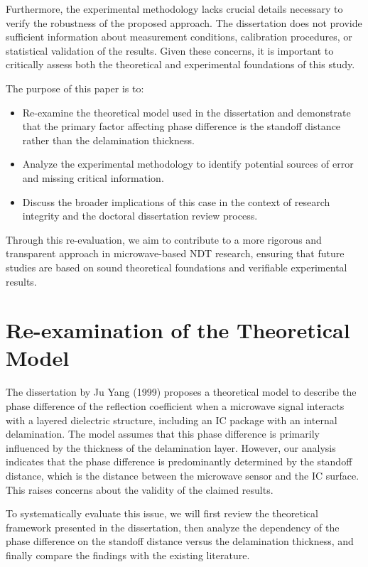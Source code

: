 \documentclass[10pt,twocolumn]{article}
\begin{document}
Furthermore, the experimental methodology lacks crucial details necessary to verify the robustness of the proposed approach. The dissertation does not provide sufficient information about measurement conditions, calibration procedures, or statistical validation of the results. Given these concerns, it is important to critically assess both the theoretical and experimental foundations of this study.

The purpose of this paper is to:
\begin{itemize}
    \item Re-examine the theoretical model used in the dissertation and demonstrate that the primary factor affecting phase difference is the standoff distance rather than the delamination thickness.
    \item Analyze the experimental methodology to identify potential sources of error and missing critical information.
    \item Discuss the broader implications of this case in the context of research integrity and the doctoral dissertation review process.
\end{itemize}

Through this re-evaluation, we aim to contribute to a more rigorous and transparent approach in microwave-based NDT research, ensuring that future studies are based on sound theoretical foundations and verifiable experimental results.

\section{Re-examination of the Theoretical Model}

The dissertation by Ju Yang (1999) proposes a theoretical model to describe the phase difference of the reflection coefficient when a microwave signal interacts with a layered dielectric structure, including an IC package with an internal delamination. The model assumes that this phase difference is primarily influenced by the thickness of the delamination layer. However, our analysis indicates that the phase difference is predominantly determined by the standoff distance, which is the distance between the microwave sensor and the IC surface. This raises concerns about the validity of the claimed results.

To systematically evaluate this issue, we will first review the theoretical framework presented in the dissertation, then analyze the dependency of the phase difference on the standoff distance versus the delamination thickness, and finally compare the findings with the existing literature.
\end{document}
